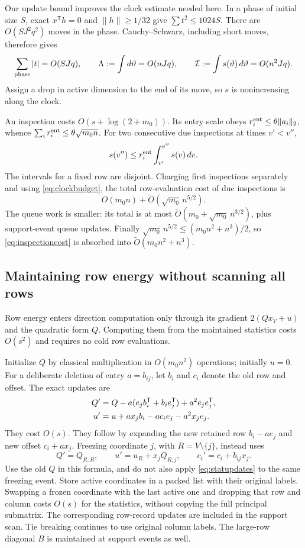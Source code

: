 \documentclass[11pt]{amsart}
\theoremstyle{remark}\newtheorem{remark}[theorem]{Remark}
\newcommand{\T}{\mathsf T}
\begin{document}
Our update bound improves the clock estimate needed here. In a phase of
initial size $S$, exact $x^\T h=0$ and $\|h\|\ge1/32$ give
$\sum t^2\le1024S$. There are $O(SJ^2q^2)$ moves in the phase.
Cauchy--Schwarz, including short moves, therefore gives
\begin{equation}\label{eq:clockbudget}
 \sum_{\rm phase}|t|=O(SJq),\qquad
 \Lambda:=\int d\vartheta=O(nJq),\qquad
 \mathcal I:=\int s(\vartheta)\,d\vartheta=O(n^2Jq).
\end{equation}
Assign a drop in active dimension to the end of its move, so $s$ is
nonincreasing along the clock.

An inspection costs $O(s+\log(2+m_0))$. Its entry scale obeys
$r_i^{\rm ent}\le\theta\|a_i\|_2$, whence
$\sum_i r_i^{\rm ent}\le\theta\sqrt{m_0n}$.
For two consecutive due inspections at times $v'<v''$,
\[
 s(v'')\le r_i^{\rm ent}\int_{v'}^{v''}s(v)\,dv.
\]
The intervals for a fixed row are disjoint. Charging first inspections
separately and using \eqref{eq:clockbudget}, the total row-evaluation cost
of due inspections is
\begin{equation}\label{eq:inspectioncost}
 O(m_0n)+\widetilde O(\sqrt{m_0}\,n^{5/2}).
\end{equation}
The queue work is smaller: its total is at most
$\widetilde O(m_0+\sqrt{m_0}\,n^{3/2})$, plus support-event queue updates.
Finally
$\sqrt{m_0}\,n^{5/2}\le(m_0n^2+n^3)/2$,
so \eqref{eq:inspectioncost} is absorbed into
$\widetilde O(m_0n^2+n^3)$.

\subsection{Maintaining row energy without scanning all rows}
Row energy enters direction computation only through its gradient
$2(Qx_V+u)$ and the quadratic form $Q$. Computing them from the maintained
statistics costs $O(s^2)$ and requires no cold row evaluations.

Initialize $Q$ by classical multiplication in $O(m_0n^2)$ operations;
initially $u=0$. For a deliberate deletion of entry $a=b_{ij}$, let $b_i$
and $c_i$ denote the old row and offset. The exact updates are
\begin{align}\label{eq:statupdates}
 Q'&=Q-a(e_jb_i^\T+b_ie_j^\T)+a^2e_je_j^\T,\notag\\
 u'&=u+ax_jb_i-ac_ie_j-a^2x_je_j.
\end{align}
They cost $O(s)$. They follow by expanding the new retained row
$b_i-ae_j$ and new offset $c_i+ax_j$.
Freezing coordinate $j$, with $R=V\setminus\{j\}$, instead uses
\[
 Q'=Q_{R,R},\qquad u'=u_R+x_jQ_{R,j},\qquad
 c_i'=c_i+b_{ij}x_j.
\]
Use the old $Q$ in this formula, and do not also apply
\eqref{eq:statupdates} to the same freezing event.
Store active coordinates in a packed list with their original labels.
Swapping a frozen coordinate with the last active one and dropping that
row and column costs $O(s)$ for the statistics, without copying the full
principal submatrix. The corresponding row-record updates are included
in the support scan. Tie breaking continues to use original column labels.
The large-row diagonal $B$ is maintained at support events as well.
\end{document}
